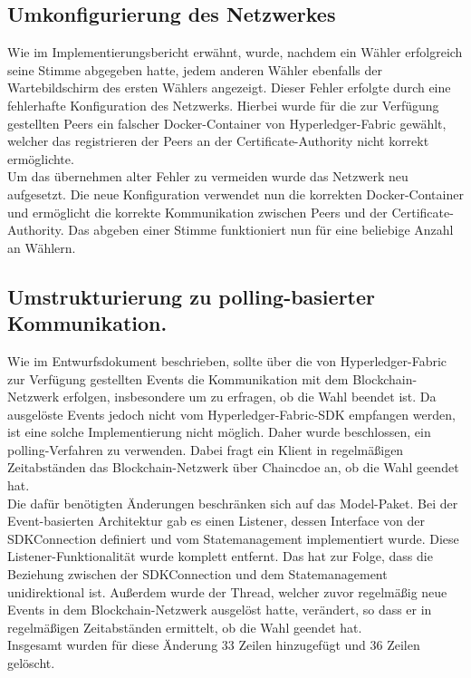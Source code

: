 \documentclass[parskip=full]{scrartcl}
\begin{document}
\subsection{Umkonfigurierung des Netzwerkes}
Wie im Implementierungsbericht erwähnt, wurde, nachdem ein Wähler erfolgreich seine Stimme abgegeben hatte, jedem anderen Wähler ebenfalls der Wartebildschirm des ersten Wählers angezeigt. Dieser Fehler erfolgte durch eine fehlerhafte Konfiguration des Netzwerks. Hierbei wurde für die zur Verfügung gestellten Peers ein falscher Docker-Container von Hyperledger-Fabric gewählt, welcher das registrieren der Peers an der Certificate-Authority nicht korrekt ermöglichte.
\\
Um das übernehmen alter Fehler zu vermeiden wurde das Netzwerk neu aufgesetzt. Die neue Konfiguration verwendet nun die korrekten Docker-Container und ermöglicht die korrekte Kommunikation zwischen Peers und der Certificate-Authority. Das abgeben einer Stimme funktioniert nun für eine beliebige Anzahl an Wählern.

\subsection{Umstrukturierung zu polling-basierter Kommunikation.}
Wie im Entwurfsdokument beschrieben, sollte über die von Hyperledger-Fabric zur Verfügung gestellten Events die Kommunikation mit dem Blockchain-Netzwerk erfolgen, insbesondere um zu erfragen, ob die Wahl beendet ist. Da ausgelöste Events jedoch nicht vom Hyperledger-Fabric-SDK empfangen werden, ist eine solche Implementierung nicht möglich. Daher wurde beschlossen, ein polling-Verfahren zu verwenden. Dabei fragt ein Klient in regelmäßigen Zeitabständen das Blockchain-Netzwerk über Chaincdoe an, ob die Wahl geendet hat.
\\
Die dafür benötigten Änderungen beschränken sich auf das Model-Paket. Bei der Event-basierten Architektur gab es einen Listener, dessen Interface von der SDKConnection definiert und vom Statemanagement implementiert wurde. Diese Listener-Funktionalität wurde komplett entfernt. Das hat zur Folge, dass die Beziehung zwischen der SDKConnection und dem Statemanagement unidirektional ist. Außerdem wurde der Thread, welcher zuvor regelmäßig neue Events in dem Blockchain-Netzwerk ausgelöst hatte, verändert, so dass er in regelmäßigen Zeitabständen ermittelt, ob die Wahl geendet hat.
\\
Insgesamt wurden für diese Änderung 33 Zeilen hinzugefügt und 36 Zeilen gelöscht.
\end{document}
